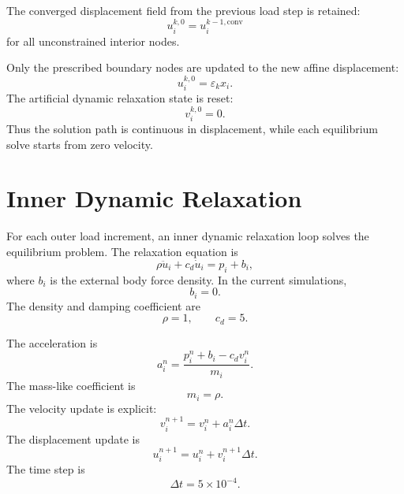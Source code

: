 \documentclass[11pt]{article}
\begin{document}
The converged displacement field from the previous load step is retained:
\begin{equation}
u_i^{k,0}
=
u_i^{k-1,\mathrm{conv}}
\end{equation}
for all unconstrained interior nodes.

Only the prescribed boundary nodes are updated to the new affine displacement:
\begin{equation}
u_i^{k,0}
=
\varepsilon_k x_i.
\end{equation}
The artificial dynamic relaxation state is reset:
\begin{equation}
v_i^{k,0}=0.
\end{equation}
Thus the solution path is continuous in displacement, while each equilibrium solve starts from zero velocity.

\section{Inner Dynamic Relaxation}

For each outer load increment, an inner dynamic relaxation loop solves the equilibrium problem. The relaxation equation is
\begin{equation}
\rho \ddot{u}_i
+
c_d \dot{u}_i
=
p_i+b_i,
\end{equation}
where \(b_i\) is the external body force density. In the current simulations,
\begin{equation}
b_i=0.
\end{equation}
The density and damping coefficient are
\begin{equation}
\rho = 1,
\qquad
c_d = 5.
\end{equation}

The acceleration is
\begin{equation}
a_i^n
=
\frac{
p_i^n+b_i-c_d v_i^n
}{
m_i
}.
\end{equation}
The mass-like coefficient is
\begin{equation}
m_i = \rho.
\end{equation}
The velocity update is explicit:
\begin{equation}
v_i^{n+1}
=
v_i^n+a_i^n\Delta t.
\end{equation}
The displacement update is
\begin{equation}
u_i^{n+1}
=
u_i^n+v_i^{n+1}\Delta t.
\end{equation}
The time step is
\begin{equation}
\Delta t = 5\times 10^{-4}.
\end{equation}
\end{document}
